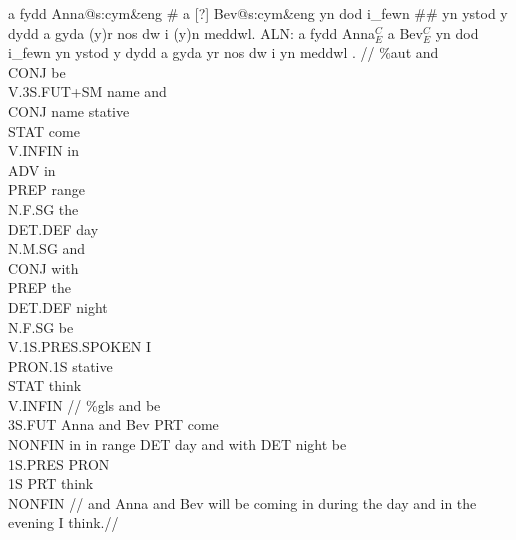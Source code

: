 \documentclass[12pt]{article}
\begin{document}
\ex
\def\suffdot#1{{\scriptsize .#1}}%
\begingl
a fydd Anna@s:cym\&eng \# a [?] Bev@s:cym\&eng yn dod i\_fewn \#\# yn
   ystod y dydd a gyda (y)r nos dw i (y)n meddwl.
\gla ALN:  a fydd Anna$^{C}_{E}$ a Bev$^{C}_{E}$ yn dod i\_fewn yn
   ystod y dydd a gyda yr nos dw i yn meddwl .  //
\glb \%aut  and\\{CONJ} be\\{V.3S.FUT+SM} name and\\{CONJ} name
   stative\\{STAT} come\\{V.INFIN} in\\{ADV} in\\{PREP}
   range\\{N.F.SG} the\\{DET.DEF} day\\{N.M.SG} and\\{CONJ}
   with\\{PREP} the\\{DET.DEF} night\\{N.F.SG} be\\{V.1S.PRES.SPOKEN}
   I\\{PRON.1S} stative\\{STAT} think\\{V.INFIN}   //
\glb \%gls  and be\\{3S.FUT} Anna and Bev PRT come\\{NONFIN} in in
   range DET day and with DET night be\\{1S.PRES} PRON\\{1S} PRT
   think\\{NONFIN}   //
\glft and Anna and Bev will be coming in during the day and in the
   evening I think.//
\endgl
\xe
\end{document}
